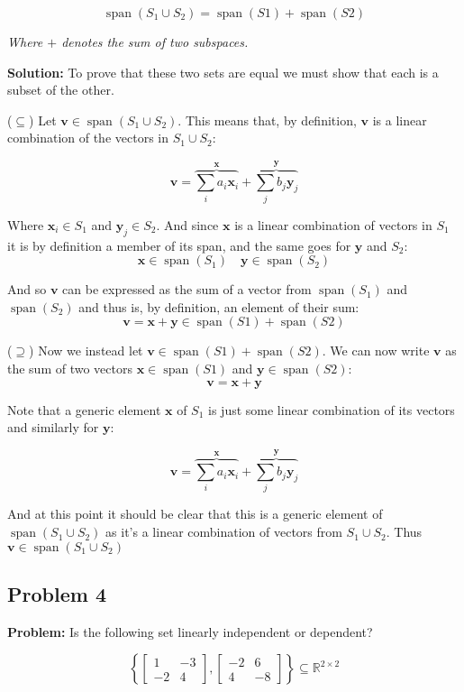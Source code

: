 \documentclass{article}
\renewcommand\vec{\mathbf}
\begin{document}
$$\operatorname{span}(S_1\cup S_2) = \operatorname{span}(S1) + \operatorname{span}(S2)$$

\textit{Where $+$ denotes the sum of two subspaces.}

\bigskip

\noindent\textbf{Solution:} To prove that these two sets are equal we must show that each is a subset of the other.

($\subseteq$) Let $\vec v\in\operatorname{span}(S_1\cup S_2)$. This means that, by definition, $\vec v$ is a linear combination of the vectors in $S_1\cup S_2$:

$$\vec v=\overbrace{\sum_ia_i\vec x_i}^{\vec x}+\overbrace{\sum_jb_j\vec y_j}^{\vec y}$$

Where $\vec x_i\in S_1$ and $\vec y_j\in S_2$. And since $\vec x$ is a linear combination of vectors in $S_1$ it is by definition a member of its span, and the same goes for $\vec y$ and $S_2$:
$$\vec x\in\operatorname{span}(S_1)\quad\vec y\in\operatorname{span}(S_2)$$

And so $\vec v$ can be expressed as the sum of a vector from $\operatorname{span}(S_1)$ and $\operatorname{span}(S_2)$ and thus is, by definition, an element of their sum:
$$\vec v=\vec x+\vec y\in\operatorname{span}(S1) + \operatorname{span}(S2)$$

($\supseteq$) Now we instead let $\vec v\in\operatorname{span}(S1) + \operatorname{span}(S2)$. We can now write $\vec v$ as the sum of two vectors $\vec x\in\operatorname{span}(S1)$ and $\vec y\in\operatorname{span}(S2)$:
$$\vec v=\vec x+\vec y$$

Note that a generic element $\vec x$ of $S_1$ is just some linear combination of its vectors and similarly for $\vec y$:

$$\vec v=\overbrace{\sum_ia_i\vec x_i}^{\vec x}+\overbrace{\sum_jb_j\vec y_j}^{\vec y}$$

And at this point it should be clear that this is a generic element of $\operatorname{span}(S_1\cup S_2)$ as it's a linear combination of vectors from $S_1\cup S_2$. Thus $\vec v\in\operatorname{span}(S_1\cup S_2)$

\subsection*{Problem 4}
\noindent\textbf{Problem:} Is the following set linearly independent or dependent?

$$\left\{\begin{bmatrix}
    1&-3\\-2&4
\end{bmatrix},\begin{bmatrix}
    -2&6\\4&-8
\end{bmatrix}\right\}\subseteq \mathbb R^{2\times 2}$$
\end{document}
